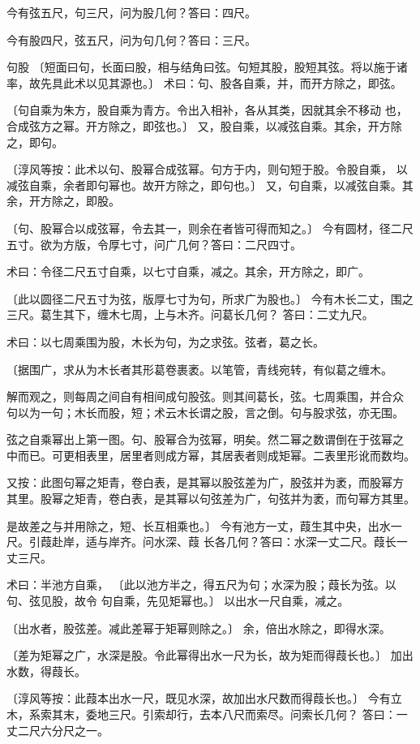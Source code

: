 \documentclass[a4paper,12pt,UTF8,twoside]{ctexbook}
\begin{document}
今有弦五尺，句三尺，问为股几何？答曰：四尺。

今有股四尺，弦五尺，问为句几何？答曰：三尺。

句股 〔短面曰句，长面曰股，相与结角曰弦。句短其股，股短其弦。将以施于诸 率，故先具此术以见其源也。〕 术曰：句、股各自乘，并，而开方除之，即弦。

〔句自乘为朱方，股自乘为青方。令出入相补，各从其类，因就其余不移动 也，合成弦方之幂。开方除之，即弦也。〕 又，股自乘，以减弦自乘。其余，开方除之，即句。

〔淳风等按：此术以句、股幂合成弦幂。句方于内，则句短于股。令股自乘， 以减弦自乘，余者即句幂也。故开方除之，即句也。〕 又，句自乘，以减弦自乘。其余，开方除之，即股。

〔句、股幂合以成弦幂，令去其一，则余在者皆可得而知之。〕 今有圆材，径二尺五寸。欲为方版，令厚七寸，问广几何？答曰：二尺四寸。

术曰：令径二尺五寸自乘，以七寸自乘，减之。其余，开方除之，即广。

〔此以圆径二尺五寸为弦，版厚七寸为句，所求广为股也。〕 今有木长二丈，围之三尺。葛生其下，缠木七周，上与木齐。问葛长几何？ 答曰：二丈九尺。

术曰：以七周乘围为股，木长为句，为之求弦。弦者，葛之长。

〔据围广，求从为木长者其形葛卷裹袤。以笔管，青线宛转，有似葛之缠木。

解而观之，则每周之间自有相间成句股弦。则其间葛长，弦。七周乘围，并合众 句以为一句；木长而股，短；术云木长谓之股，言之倒。句与股求弦，亦无围。

弦之自乘幂出上第一图。句、股幂合为弦幂，明矣。然二幂之数谓倒在于弦幂之 中而已。可更相表里，居里者则成方幂，其居表者则成矩幂。二表里形讹而数均。

又按：此图句幂之矩青，卷白表，是其幂以股弦差为广，股弦并为袤，而股幂方 其里。股幂之矩青，卷白表，是其幂以句弦差为广，句弦并为袤，而句幂方其里。

是故差之与并用除之，短、长互相乘也。〕 今有池方一丈，葭生其中央，出水一尺。引葭赴岸，适与岸齐。问水深、葭 长各几何？答曰：水深一丈二尺。葭长一丈三尺。

术曰：半池方自乘， 〔此以池方半之，得五尺为句；水深为股；葭长为弦。以句、弦见股，故令 句自乘，先见矩幂也。〕 以出水一尺自乘，减之。

〔出水者，股弦差。减此差幂于矩幂则除之。〕 余，倍出水除之，即得水深。

〔差为矩幂之广，水深是股。令此幂得出水一尺为长，故为矩而得葭长也。〕 加出水数，得葭长。

〔淳风等按：此葭本出水一尺，既见水深，故加出水尺数而得葭长也。〕 今有立木，系索其末，委地三尺。引索却行，去本八尺而索尽。问索长几何？ 答曰：一丈二尺六分尺之一。
\end{document}
